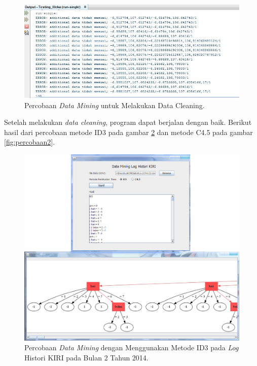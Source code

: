 \begin{figure}[H]
\centering
\includegraphics[scale=0.5]{Gambar/percobaanError.jpg}
\caption[Percobaan \textsl{Data Mining} untuk Melakukan Data Cleaning]{Percobaan \textsl{Data Mining} untuk Melakukan Data Cleaning.} 
\label{fig:percobaanError}
\end{figure}

Setelah melakukan \textsl{data cleaning}, program dapat berjalan dengan baik. Berikut hasil dari percobaan metode ID3 pada gambar \ref{fig:percobaan1} dan metode C4.5 pada gambar \ref{fig:percobaan2}.

\begin{figure}[H]
\centering
\includegraphics[scale=0.5]{Gambar/percobaan1.jpg}
\caption[Percobaan \textsl{Data Mining} dengan Menggunakan Metode ID3 pada \textsl{Log} Histori KIRI pada Bulan 2 Tahun 2014]{Percobaan \textsl{Data Mining} dengan Menggunakan Metode ID3 pada \textsl{Log} Histori KIRI pada Bulan 2 Tahun 2014.} 
\label{fig:percobaan1}
\end{figure}

